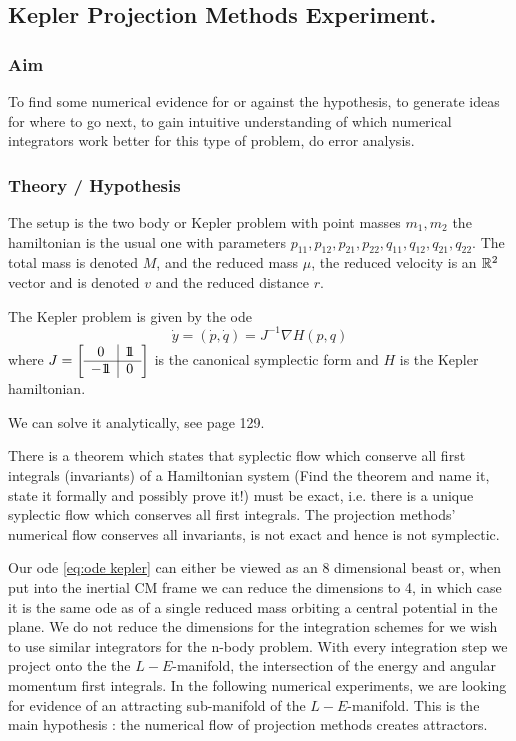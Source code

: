 \documentclass[12pt]{article}
\begin{document}
\subsection{Kepler Projection Methods Experiment.}
\subsubsection{Aim}
To find some numerical evidence for or against the hypothesis, to generate ideas for where to go next, to gain intuitive understanding of which numerical integrators work better for this type of problem, do error analysis. 

\subsubsection{Theory / Hypothesis}

The setup is the two body or Kepler problem with point masses $m_1,m_2$ the hamiltonian is the usual one with parameters $p_{11},p_{12},p_{21},p_{22},q_{11},q_{12},q_{21},q_{22}$. The total mass is denoted $M$, and the reduced mass $\mu$, the reduced velocity is an $\mathbb{R}^2$ vector and is denoted $v$ and the reduced distance $r$. 

The Kepler problem is given by the ode
\begin{equation}\label{eq:ode kepler}
    \dot y = (\dot p,\dot q) = J^{-1}\nabla H(p,q)
\end{equation}
where $J = \left[\begin{array}{c|c}0&1\!\!1\\\hline-1\!\!1&0\end{array}\right]$ is the canonical symplectic form and $H$ is the Kepler hamiltonian.

We can solve it analytically, see \cite{WBell} page 129. 

There is a theorem which states that syplectic flow which conserve all first integrals (invariants) of a Hamiltonian system (Find the theorem and name it, state it formally and possibly prove it!) must be exact, i.e. there is a unique syplectic flow which conserves all first integrals. The projection methods' numerical flow conserves all invariants, is not exact and hence is not symplectic. 


Our ode \eqref{eq:ode kepler} can either be viewed as an 8 dimensional beast or, when put into the inertial CM frame we can reduce the dimensions to 4, in which case it is the same ode as of a single reduced mass orbiting a central potential in the plane. We do not reduce the dimensions for the integration schemes for we wish to use similar integrators for the n-body problem. With every integration step we project onto the the $L-E$-manifold, the intersection of the energy and angular momentum first integrals. In the following numerical experiments, we are looking for evidence of an attracting sub-manifold of the $L-E$-manifold. This is the main hypothesis : the numerical flow of projection methods creates attractors.
\end{document}
